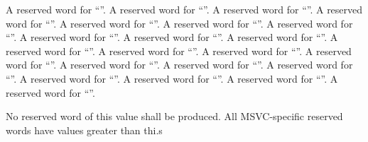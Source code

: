  A reserved word for ``''.
 A reserved word for ``''.
 A reserved word for ``''.
 A reserved word for ``''.
 A reserved word for ``''.
 A reserved word for ``''.
 A reserved word for ``''.
 A reserved word for ``''.
 A reserved word for ``''.
 A reserved word for ``''.
 A reserved word for ``''.
 A reserved word for ``''.
 A reserved word for ``''.
 A reserved word for ``''.
 A reserved word for ``''.
 A reserved word for ``''.
 A reserved word for ``''.
 A reserved word for ``''.
 A reserved word for ``''.
 A reserved word for ``''.
 A reserved word for ``''.


  No reserved word of this value shall be produced.  All MSVC-specific
reserved words have values greater than thi.s


